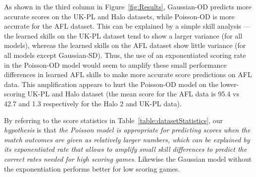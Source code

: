 
As shown in the third column in Figure~\ref{fig:Results}, Gaussian-OD
predicts more accurate scores on the UK-PL and Halo datasets, while
Poisson-OD is more accurate for the AFL dataset. This can be explained
by a simple skill analysis --- the learned skills on the UK-PL dataset
tend to show a larger variance (for all models), whereas the learned
skills on the AFL dataset show little variance (for all models except
Gaussian-SD). Thus, the use of an exponentiated scoring rate in the
Poisson-OD model would seem to amplify these small performance
differences in learned AFL skills to make more accurate score
predictions on AFL data.  This amplification appears to hurt the
Poisson-OD model on the lower-scoring UK-PL and Halo dataset (the mean
score for the AFL data is 95.4 vs 42.7 and 1.3 respectively for the
Halo 2 and UK-PL data).


\COMMENT
By referring to the score
statistics in Table~\ref{table:datasetStatistics}, our {\it
hypothesis} is that {\it the Poisson model is appropriate for
predicting scores when the match outcomes are given as relatively
larger numbers, which can be explained by its exponentiated rate that
allows to amplify small skill differences to predict the correct rates
needed for high scoring games}. Likewise the Gaussian model without
the exponentiation performs better for low scoring games.


